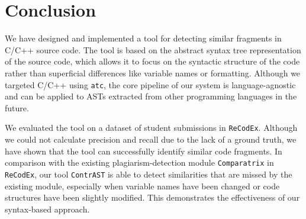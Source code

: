 \cleardoublepage
\chapter*{Conclusion}
{}
\label{sec:name:conclusion}





We have designed and implemented a tool for detecting similar fragments in C/C++ source code.
The tool is based on the abstract syntax tree representation of the source code, which allows it to focus on the syntactic structure of the code rather than superficial differences like variable names or formatting.
Although we targeted C/C++ using \texttt{atc}, the core pipeline of our system is language-agnostic and can be applied to ASTs extracted from other programming languages in the future.

We evaluated the tool on a dataset of student submissions in \texttt{ReCodEx}.
Although we could not calculate precision and recall due to the lack of a ground truth, we have shown that the tool can successfully identify similar code fragments.
In comparison with the existing plagiarism-detection module \texttt{Comparatrix} in \texttt{ReCodEx}, our tool \texttt{ContrAST} is able to detect similarities that are missed by the existing module, especially when variable names have been changed or code structures have been slightly modified.
This demonstrates the effectiveness of our syntax-based approach.

